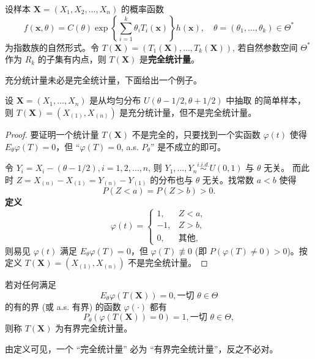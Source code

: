 \begin{theorem}[指数族中统计量的完全性] \label{thm:complete_statistic_exponential_family}
设样本 $\boldsymbol{X} = (X_1, X_2, \ldots, X_n)$ 的概率函数
\[
f(\boldsymbol{x},\theta) = C(\theta) \exp\left\{\sum_{i=1}^k \theta_i T_i(\boldsymbol{x})\right\} h(\boldsymbol{x}), \quad \theta = (\theta_1,\ldots,\theta_k) \in \Theta^*
\]
为指数族的自然形式。令 $T(\boldsymbol{X}) = (T_1(\boldsymbol{X}), \ldots, T_k(\boldsymbol{X}))$, 若自然参数空间 $\Theta^*$ 作为 $R_k$ 的子集有内点，则 $T(\boldsymbol{X})$ 是\textbf{完全统计量}。
\end{theorem}
充分统计量未必是完全统计量，下面给出一个例子。
\begin{example}
    设 $\mathbf{X} = (X_1, \dots, X_n)$ 是从均匀分布 $U(\theta - 1/2, \theta + 1/2)$ 中抽取
的简单样本，则 $T(\mathbf{X}) = (X_{(1)}, X_{(n)})$ 是充分统计量，但不是完全统计量。
\end{example}
\begin{proof}
    要证明一个统计量 $T(\mathbf{X})$ 不是完全的，只要找到一个实函数 $\varphi(t)$ 使得 $E_\theta\varphi(T) =
0$，但 “$\varphi(T) = 0$, a.s. $P_\theta$” 是不成立的即可。

令 $Y_i = X_i - (\theta - 1/2), i = 1,2,\dots,n$, 则 $Y_1, \dots, Y_n \stackrel{i.i.d.}{\sim} U(0,1)$ 与 $\theta$ 无关。
而此时 $Z = X_{(n)} - X_{(1)} = Y_{(n)} - Y_{(1)}$ 的分布也与 $\theta$ 无关。找常数 $a < b$ 使得
$$P(Z < a) = P(Z > b) > 0.$$
\textbf{定义}
$$ \varphi(t) = \begin{cases}
1, & Z < a, \\
-1, & Z > b, \\
0, & \text{其他},
\end{cases} $$
则易见 $\varphi(t)$ 满足 $E_\theta\varphi(T) = 0$，但 $\varphi(T) \not\equiv 0$ (即 $P(\varphi(T) \neq 0) > 0$)。按定义 $T(\mathbf{X}) =
(X_{(1)}, X_{(n)})$ 不是完全统计量。
\end{proof}

\begin{definition}[有界完全统计量]\label{def:有界完全统计量}
    若对任何满足
$$E_\theta\varphi(T(\mathbf{X})) = 0, \text{一切 } \theta \in \Theta$$
的有的界 (或 a.s. 有界) 的函数 $\varphi(\cdot)$ 都有
$$P_\theta(\varphi(T(\mathbf{X})) = 0) = 1, \text{一切 } \theta \in \Theta,$$
则称 $T(\mathbf{X})$ 为有界完全统计量。

\end{definition}
\begin{remark}
    由定义可见，一个 “完全统计量” 必为 “有界完全统计量”，反之不必对。
\end{remark}

